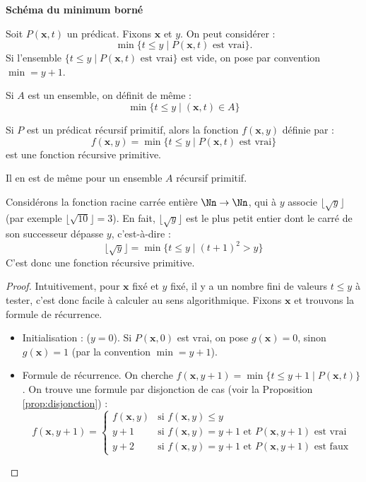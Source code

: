 \documentclass[11pt,class=report,crop=false]{standalone}
\begin{document}
\medskip

\textbf{Schéma du minimum borné}

Soit $P(\mathbf{x}, t)$ un prédicat. Fixons $\mathbf{x}$ et $y$.
On peut considérer :
\[ \min \{ t \le y \mid P(\mathbf{x}, t) \text{ est vrai} \}. \]
Si l'ensemble $\{ t \le y \mid P(\mathbf{x}, t) \text{ est vrai} \}$ est vide, on pose par convention $\min = y+1$.


Si $A$ est un ensemble, on définit de même :
\[ \min \{ t \le y \mid (\mathbf{x}, t) \in A \} \]

\begin{proposition}
Si $P$ est un prédicat récursif primitif, alors la fonction $f(\mathbf{x},y)$ définie par :
\[ f(\mathbf{x},y) = \min \{ t \le y \mid P(\mathbf{x},t) \text{ est vrai} \} \]
est une fonction récursive primitive.

Il en est de même pour un ensemble $A$ récursif primitif.
\end{proposition}

\begin{exemple}
Considérons la fonction racine carrée entière $\Nn \to \Nn$, qui à $y$ associe $\lfloor \sqrt{y} \rfloor$ (par exemple $\lfloor \sqrt{10} \rfloor = 3$). En fait, $\lfloor \sqrt{y} \rfloor$ est le plus petit entier dont le carré de son successeur dépasse $y$, c'est-à-dire :
\[ \lfloor \sqrt{y} \rfloor = \min \{ t \le y \mid (t+1)^2 > y \} \]
C'est donc une fonction récursive primitive.
\end{exemple}

\begin{proof}
Intuitivement, pour $\mathbf{x}$ fixé et $y$ fixé, il y a un nombre fini de valeurs $t \le y$ à tester, c'est donc facile à calculer au sens algorithmique.
Fixons $\mathbf{x}$ et trouvons la formule de récurrence.

\begin{itemize}
    \item Initialisation : ($y=0$).
    Si $P(\mathbf{x}, 0)$ est vrai, on pose $g(\mathbf{x})=0$, sinon $g(\mathbf{x})=1$ (par la convention $\min = y+1$).
    
    \item Formule de récurrence.
    On cherche $f(\mathbf{x}, y+1) = \min \{ t \le y+1 \mid P(\mathbf{x}, t) \}$.
    On trouve une formule par disjonction de cas (voir la Proposition \ref{prop:disjonction}) :
    \[ f(\mathbf{x}, y+1) = \begin{cases} 
        f(\mathbf{x},y) & \text{si } f(\mathbf{x},y) \le y \\ 
        y+1 & \text{si } f(\mathbf{x},y) = y+1 \text{ et } P(\mathbf{x}, y+1) \text{ est vrai} \\ 
        y+2 & \text{si } f(\mathbf{x},y) = y+1 \text{ et } P(\mathbf{x}, y+1) \text{ est faux} 
    \end{cases} \]
\end{itemize}
\end{proof}
\end{document}

